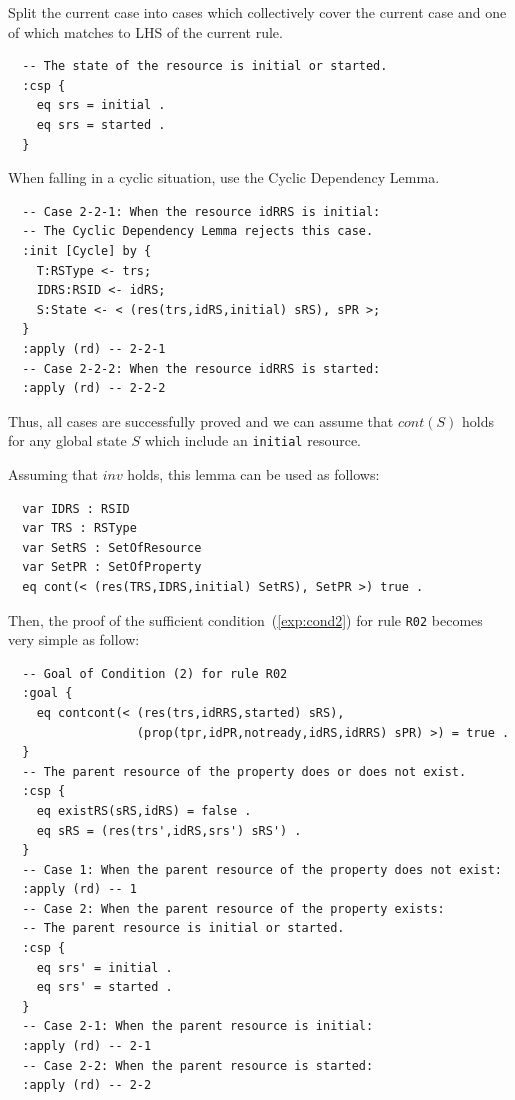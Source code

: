 \documentclass[12pt]{report}
\begin{document}
 Split the current case into cases which
collectively cover the current case and one of which matches to LHS of
the current rule. 
\small
\begin{verbatim}
  -- The state of the resource is initial or started.
  :csp { 
    eq srs = initial .
    eq srs = started .
  }
\end{verbatim}
\normalsize
 When falling in a cyclic situation, use the
Cyclic Dependency Lemma. 
\small
\begin{verbatim}
  -- Case 2-2-1: When the resource idRRS is initial:
  -- The Cyclic Dependency Lemma rejects this case.
  :init [Cycle] by {
    T:RSType <- trs;
    IDRS:RSID <- idRS;
    S:State <- < (res(trs,idRS,initial) sRS), sPR >;
  }
  :apply (rd) -- 2-2-1
  -- Case 2-2-2: When the resource idRRS is started:
  :apply (rd) -- 2-2-2
\end{verbatim}
\normalsize
Thus, all cases are successfully proved and we can assume that $cont(S)$
holds for any global state $S$ which include an {\tt initial}
resource.

Assuming that $inv$ holds, this lemma can be used as follows:
\small
\begin{verbatim}
  var IDRS : RSID 
  var TRS : RSType
  var SetRS : SetOfResource
  var SetPR : SetOfProperty
  eq cont(< (res(TRS,IDRS,initial) SetRS), SetPR >) true .
\end{verbatim}
\normalsize
Then, the proof of the sufficient condition~(\ref{exp:cond2}) for rule
{\tt R02} becomes very simple as follow:
\small
\begin{verbatim}
  -- Goal of Condition (2) for rule R02
  :goal {
    eq contcont(< (res(trs,idRRS,started) sRS),
                  (prop(tpr,idPR,notready,idRS,idRRS) sPR) >) = true .
  }
  -- The parent resource of the property does or does not exist.
  :csp {
    eq existRS(sRS,idRS) = false .
    eq sRS = (res(trs',idRS,srs') sRS') .
  }
  -- Case 1: When the parent resource of the property does not exist:
  :apply (rd) -- 1
  -- Case 2: When the parent resource of the property exists:
  -- The parent resource is initial or started.
  :csp {
    eq srs' = initial .
    eq srs' = started .
  }
  -- Case 2-1: When the parent resource is initial:
  :apply (rd) -- 2-1
  -- Case 2-2: When the parent resource is started:
  :apply (rd) -- 2-2
\end{verbatim}
\normalsize
\end{document}
